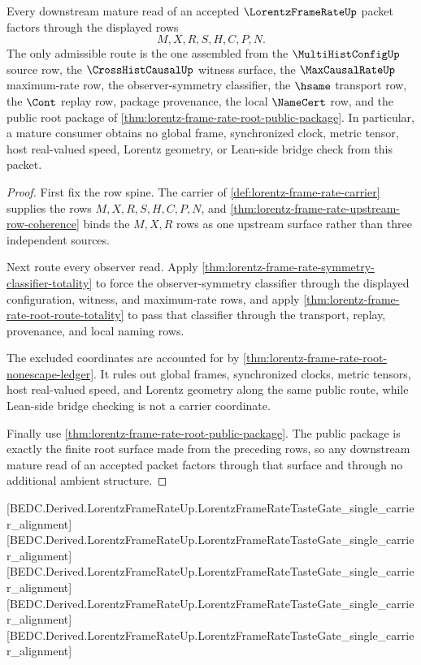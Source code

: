 \begin{theorem}
\label{thm:lorentz-frame-rate-mature-route-completeness}
Every downstream mature read of an accepted $\LorentzFrameRateUp$ packet
factors through the displayed rows
$$
M,X,R,S,H,C,P,N.
$$
The only admissible route is the one assembled from the
$\MultiHistConfigUp$ source row, the $\CrossHistCausalUp$ witness surface,
the $\MaxCausalRateUp$ maximum-rate row, the observer-symmetry classifier,
the $\hsame$ transport row, the $\Cont$ replay row, package provenance, the
local $\NameCert$ row, and the public root package of
\autoref{thm:lorentz-frame-rate-root-public-package}. In particular, a
mature consumer obtains no global frame, synchronized clock, metric tensor,
host real-valued speed, Lorentz geometry, or Lean-side bridge check from this
packet.
\end{theorem}
\begin{proof}
First fix the row spine. The carrier of
\autoref{def:lorentz-frame-rate-carrier} supplies the rows
$M,X,R,S,H,C,P,N$, and
\autoref{thm:lorentz-frame-rate-upstream-row-coherence} binds the
$M,X,R$ rows as one upstream surface rather than three independent sources.

Next route every observer read. Apply
\autoref{thm:lorentz-frame-rate-symmetry-classifier-totality} to force the
observer-symmetry classifier through the displayed configuration, witness,
and maximum-rate rows, and apply
\autoref{thm:lorentz-frame-rate-root-route-totality} to pass that classifier
through the transport, replay, provenance, and local naming rows.

The excluded coordinates are accounted for by
\autoref{thm:lorentz-frame-rate-root-nonescape-ledger}. It rules out global
frames, synchronized clocks, metric tensors, host real-valued speed, and
Lorentz geometry along the same public route, while Lean-side bridge checking
is not a carrier coordinate.

Finally use \autoref{thm:lorentz-frame-rate-root-public-package}. The public
package is exactly the finite root surface made from the preceding rows, so
any downstream mature read of an accepted packet factors through that surface
and through no additional ambient structure.
\end{proof}

[BEDC.Derived.LorentzFrameRateUp.LorentzFrameRateTasteGate\_single\_carrier\_alignment]
[BEDC.Derived.LorentzFrameRateUp.LorentzFrameRateTasteGate\_single\_carrier\_alignment]
[BEDC.Derived.LorentzFrameRateUp.LorentzFrameRateTasteGate\_single\_carrier\_alignment]
[BEDC.Derived.LorentzFrameRateUp.LorentzFrameRateTasteGate\_single\_carrier\_alignment]
[BEDC.Derived.LorentzFrameRateUp.LorentzFrameRateTasteGate\_single\_carrier\_alignment]

